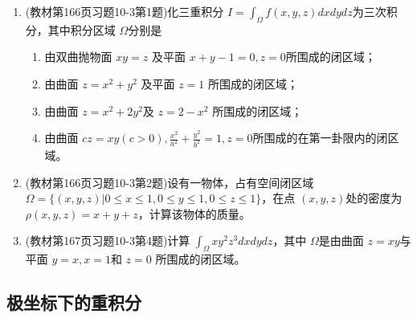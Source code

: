 \begin{enumerate}
    \item (教材第166页习题10-3第1题)化三重积分 $I = \int _\Omega f(x,y,z) dxdydz$为三次积分，其中积分区域 $\Omega$分别是
        \begin{enumerate}[(1)]
            \item 由双曲抛物面 $xy=z$ 及平面 $x+y-1=0, z=0$所围成的闭区域；
            \item 由曲面 $z=x^2+y^2$ 及平面 $z=1$ 所围成的闭区域；
            \item 由曲面 $z= x^2 + 2y^2$及 $z=2-x^2$ 所围成的闭区域；
            \item 由曲面 $cz = xy (c>0), \frac{x^2}{a^2} + \frac{y^2}{b^2}=1, z=0$所围成的在第一卦限内的闭区域。
        \end{enumerate}

    \item (教材第166页习题10-3第2题)设有一物体，占有空间闭区域 $\Omega = \{ (x,y,z) | 0 \le x \le 1, 0 \le y \le 1, 0 \le z \le 1  \}$，在点 $(x,y,z)$处的密度为 $\rho (x,y,z) = x+y+z$，计算该物体的质量。

    \item (教材第167页习题10-3第4题)计算 $\int _\Omega xy^2z^3 dxdydz$，其中 $\Omega$是由曲面 $z=xy$与平面 $y=x,x=1$和 $z=0$ 所围成的闭区域。
\end{enumerate}

\subsection{极坐标下的重积分}
